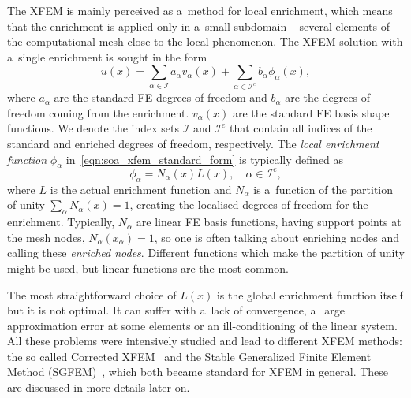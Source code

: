 The XFEM is mainly perceived as a~method for local enrichment, which means that the enrichment is applied only
in a~small subdomain -- several elements of the computational mesh close to the local phenomenon.
The XFEM solution with a~single enrichment is sought in the form
\begin{equation} \label{eqn:soa_xfem_standard_form}
  u(x) = \sum_{\alpha\in\mathcal{I}}a_\alpha v_\alpha(x)
    + \sum_{\alpha\in\mathcal{I}^e} b_{\alpha} \phi_{\alpha}(x),
\end{equation}
where $a_\alpha$ are the standard FE degrees of freedom and $b_{\alpha}$ are the degrees of freedom coming from
the enrichment. $v_\alpha(x)$ are the standard FE basis shape functions. We denote the index sets $\mathcal{I}$ and
$\mathcal{I}^e$ that contain all indices of the standard and enriched degrees of freedom, respectively.
The \emph{local enrichment function} $\phi_{\alpha}$ in~\eqref{eqn:soa_xfem_standard_form} is typically defined as
\begin{equation} \label{eqn:soa_xfem_enrich}
    \phi_{\alpha} = N_\alpha(x)L(x), \quad \alpha\in\mathcal{I}^e,
\end{equation}
where $L$ is the actual enrichment function and $N_\alpha$ is a~function of the partition of unity
$\sum_\alpha N_\alpha(x) = 1$, creating the localised degrees of freedom for the enrichment.
Typically, $N_\alpha$ are linear FE basis functions, having support points at the mesh nodes, $N_\alpha(x_\alpha)=1$,
so one is often talking about enriching nodes and calling these \emph{enriched nodes}.
Different functions which make the partition of unity might be used, but linear functions are the most common.


The most straightforward choice of $L(x)$ is the global enrichment function itself but it is not optimal. It can suffer with a~lack of convergence, a~large approximation error at some elements or an ill-conditioning of the linear system.
All these problems were intensively studied and lead to different XFEM methods:
the so called Corrected XFEM~\cite{fries_corrected_2008}
and the Stable Generalized Finite Element Method (SGFEM)~\cite{babuska_stable_2012, gupta_stable_2013}, which 
both became standard for XFEM in general. These are discussed in more details later on.

